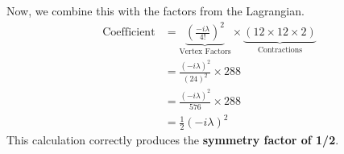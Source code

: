 \documentclass{article}
\begin{document}
Now, we combine this with the factors from the Lagrangian.
\begin{align*}
    \text{Coefficient} &= \underbrace{\left(\frac{-i\lambda}{4!}\right)^2}_{\text{Vertex Factors}} \times \underbrace{(12 \times 12 \times 2)}_{\text{Contractions}} \\
    &= \frac{(-i\lambda)^2}{(24)^2} \times 288 \\
    &= \frac{(-i\lambda)^2}{576} \times 288 \\
    &= \frac{1}{2}(-i\lambda)^2
\end{align*}
This calculation correctly produces the \textbf{symmetry factor of 1/2}.
\end{document}
